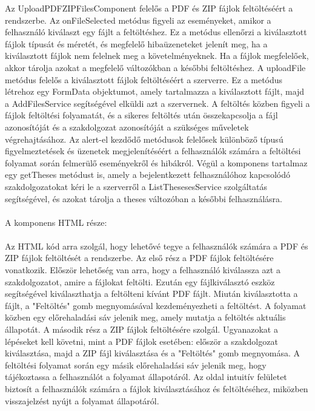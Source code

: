 Az UploadPDFZIPFilesComponent felelős a PDF és ZIP fájlok feltöltéséért a rendszerbe. Az onFileSelected metódus figyeli az eseményeket, amikor a felhasználó kiválaszt egy fájlt a feltöltéshez. Ez a metódus ellenőrzi a kiválasztott fájlok típusát és méretét, és megfelelő hibaüzeneteket jelenít meg, ha a kiválasztott fájlok nem felelnek meg a követelményeknek. Ha a fájlok megfelelőek, akkor tárolja azokat a megfelelő változókban a későbbi feltöltéshez. A uploadFile metódus felelős a kiválasztott fájlok feltöltéséért a szerverre. Ez a metódus létrehoz egy FormData objektumot, amely tartalmazza a kiválasztott fájlt, majd a AddFilesService segítségével elküldi azt a szervernek. A feltöltés közben figyeli a fájlok feltöltési folyamatát, és a sikeres feltöltés után összekapcsolja a fájl azonosítóját és a szakdolgozat azonosítóját a szükséges műveletek végrehajtásához. Az alert-el kezdődő metódusok felelősek különböző típusú figyelmeztetések és üzenetek megjelenítéséért a felhasználók számára a feltöltési folyamat során felmerülő eseményekről és hibákról. Végül a komponens tartalmaz egy getTheses metódust is, amely a bejelentkezett felhasználóhoz kapcsolódó szakdolgozatokat kéri le a szerverről a ListThesesesService szolgáltatás segítségével, és azokat tárolja a theses változóban a későbbi felhasználásra.\\
\\
A komponens HTML része:\\
\\
Az HTML kód arra szolgál, hogy lehetővé tegye a felhasználók számára a PDF és ZIP fájlok feltöltését a rendszerbe. Az első rész a PDF fájlok feltöltésére vonatkozik. Először lehetőség van arra, hogy a felhasználó kiválassza azt a szakdolgozatot, amire a fájlokat feltölti. Ezután egy fájlkiválasztó eszköz segítségével kiválaszthatja a feltölteni kívánt PDF fájlt. Miután kiválasztotta a fájlt, a "Feltöltés" gomb megnyomásával kezdeményezheti a feltöltést. A folyamat közben egy előrehaladási sáv jelenik meg, amely mutatja a feltöltés aktuális állapotát. A második rész a ZIP fájlok feltöltésére szolgál. Ugyanazokat a lépéseket kell követni, mint a PDF fájlok esetében: először a szakdolgozat kiválasztása, majd a ZIP fájl kiválasztása és a "Feltöltés" gomb megnyomása. A feltöltési folyamat során egy másik előrehaladási sáv jelenik meg, hogy tájékoztassa a felhasználót a folyamat állapotáról. Az oldal intuitív felületet biztosít a felhasználók számára a fájlok kiválasztásához és feltöltéséhez, miközben visszajelzést nyújt a folyamat állapotáról.

